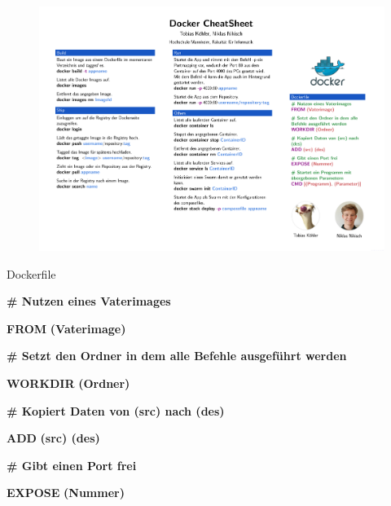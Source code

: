 \documentclass[final]{beamer}
\newlength{\onecolwid}
\begin{document}
\begin{frame}
\begin{columns}[t]
\begin{column}{\onecolwid}
\begin{figure}
\begin{center}
\vfill
\includegraphics[scale=0.7]{docker}
\end{center}
\end{figure}



\begin{block}{Dockerfile}

\par \textcolor{docker-green}{\textbf{\# Nutzen eines Vaterimages}}
\par \textcolor{docker-pu}{\textbf{FROM}} \textcolor{docker-red}{\textbf{(Vaterimage)}}

\vspace{1cm}
\par \textcolor{docker-green}{\textbf{\# Setzt den Ordner in dem alle Befehle ausgeführt werden}}
\par \textcolor{docker-pu}{\textbf{WORKDIR}} \textcolor{docker-red}{\textbf{(Ordner)}}

\vspace{1cm}
\par \textcolor{docker-green}{\textbf{\# Kopiert Daten von (src) nach (des)}}
\par \textcolor{docker-pu}{\textbf{ADD}} \textcolor{docker-red}{\textbf{(src) (des)}}

\vspace{1cm}
\par \textcolor{docker-green}{\textbf{\# Gibt einen Port frei}}
\par \textcolor{docker-pu}{\textbf{EXPOSE}} \textcolor{docker-red}{\textbf{(Nummer)}}


\end{block}
\end{column}
\end{columns}
\end{frame}
\end{document}
